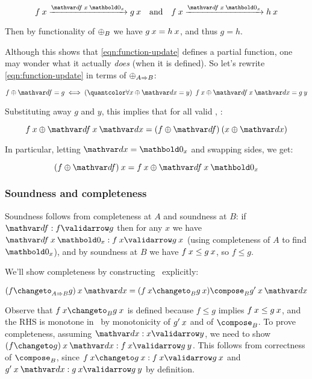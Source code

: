 \nopagebreak[2]
\[ \vld{\df \<x \<\zero_x}{f \<x}{g\<x}
\quad\text{and}\quad \vld{\df \<x \<\zero_x}{f \<x}{h\<x} \]

\noindent
Then by functionality of ${\mathbin{\oplus}}_B$ we have $g\<x = h\<x$, and thus $g = h$.

Although this shows that \cref{eqn:function-update} defines a partial function,
one may wonder what it actually \emph{does} (when it is defined). So let's
rewrite \cref{eqn:function-update} in terms of $\mathbin{\oplus}_{A \Rightarrow B}$:

\nopagebreak[2]
\[ f \upd \df = g \iff \fa{x \upd \dx = y} f\<x \upd \df\<x\<\dx = g\<y \]

\noindent Substituting away $g$ and $y$, this implies that for all valid
\dx, \df:

\nopagebreak[2]
\[
f\<x \upd \df\<x\<\dx = (f \upd \df) \<(x \upd \dx)
\]

\noindent In particular, letting $\dx = \zero_x$ and swapping sides, we get:

\nopagebreak[2]
\[ (f \upd \df) \<x = f\<x \upd \df\<x\<\zero_x \]

\noindent
{}

\subsubsection{Soundness and completeness}

Soundness follows from completeness at $A$ and soundness at $B$: if $\valid\df f
g$ then for any $x$ we have $\valid{\df\<x\<\zero_x}{f\<x}{g\<x}$ (using
completeness of $A$ to find $\zero_x$), and by soundness at $B$ we have $f\<x
\le g\<x$, so $f \le g$.

We'll show completeness by constructing \changetofn\ explicitly:

\nopagebreak[2]
\[ (f \changeto_{\expO A B} g) \<x \<\dx = (f\<x \changeto_B g\<x) \compose_B \deriv g\<x\<\dx\]

\noindent Observe that $f\<x \changeto_B g\<x$ is defined because $f \le g$
implies $f\<x \le g\<x$, and the RHS is monotone in \dx\ by monotonicity of
$\deriv g \<x$ and of $\composefn_B$.
%
To prove completeness, assuming $\valid\dx x y$, we need to show \( \valid{(f
  \changeto g) \<x \<\dx}{f\<x}{g\<y} \). This follows from correctness of
$\composefn_B$, since \( \valid{f\<x \changeto g\<x}{f\<x}{g\<x} \) and
\(\valid{\deriv g \<x \<\dx}{g\<x}{g\<y}\) by definition.

